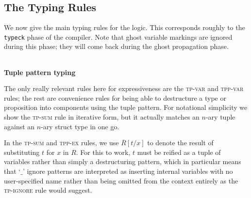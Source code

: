 \documentclass[acmsmall,nonacm]{acmart}
\DeclareMathOperator*{\Sep}{\scalerel*{\ast}{\sum}}
\newcommand{\proves}{\vdash}
\newcommand{\judgment}[2][]{\noindent\\\textbf{#1}\hspace{\stretch{1}}\fbox{$#2$}\nopagebreak}
\newcommand*{\axiom}[2][]{\infer[#1]{}{#2}}
\begin{document}
\subsection{The Typing Rules}

We now give the main typing rules for the logic. This corresponds roughly to the \texttt{typeck} phase of the compiler. Note that ghost variable markings are ignored during this phase; they will come back during the ghost propagation phase.

\judgment[Tuple pattern typing]{\Gamma \proves t:\tau \Rightarrow \overline{R}}

The only really relevant rules here for expressiveness are the \textsc{tp-var} and \textsc{tpp-var} rules; the rest are convenience rules for being able to destructure a type or proposition into components using the tuple pattern. For notational simplicity we show the \textsc{tp-sum} rule in iterative form, but it actually matches an $n$-ary tuple against an $n$-ary struct type in one go.

In the \textsc{tp-sum} and \textsc{tpp-ex} rules, we use $\overline{R}[t/x]$ to denote the result of substituting $t$ for $x$ in $R$. For this to work, $t$ must be reified as a tuple of variables rather than simply a destructuring pattern, which in particular means that `$\_$' ignore patterns are interpreted as inserting internal variables with no user-specified name rather than being omitted from the context entirely as the \textsc{tp-ignore} rule would suggest.
\end{document}
